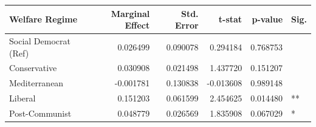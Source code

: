 \begin{tabular}{lrrrrl}
\toprule
Welfare Regime & Marginal Effect & Std. Error & t-stat & p-value & Sig. \\
\midrule
Social Democrat (Ref) & 0.026499 & 0.090078 & 0.294184 & 0.768753 &  \\
Conservative & 0.030908 & 0.021498 & 1.437720 & 0.151207 &  \\
Mediterranean & -0.001781 & 0.130838 & -0.013608 & 0.989148 &  \\
Liberal & 0.151203 & 0.061599 & 2.454625 & 0.014480 & ** \\
Post-Communist & 0.048779 & 0.026569 & 1.835908 & 0.067029 & * \\
\bottomrule
\end{tabular}
